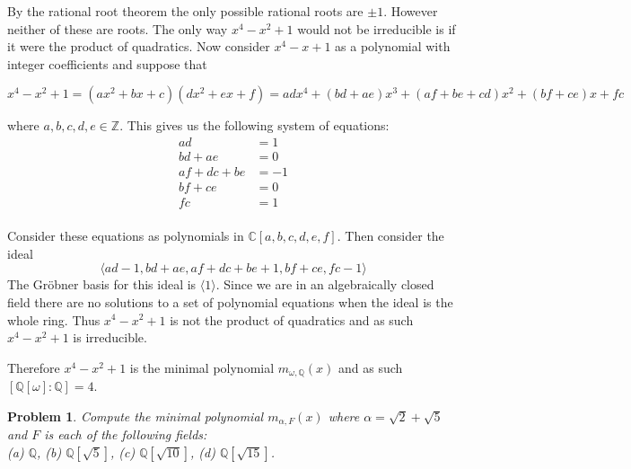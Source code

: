 \documentclass[10pt]{article}
\newcommand{\bb}[1]{\mathbb{#1}}
\theoremstyle{plain}
\newtheorem{problem}{Problem}
\theoremstyle{remark}
\begin{document}
By the rational root theorem the only possible rational roots are $\pm 1$.
However neither of these are roots. The only way $x^4-x^2+1$ would not
be irreducible is if it were the product of quadratics. Now consider
$x^4-x+1$ as a polynomial with integer coefficients and suppose that

\[x^4-x^2+1 = (ax^2+bx+c)(dx^2+ex+f)=adx^4+(bd+ae)x^3+(af+be+cd)x^2+(bf+ce)x+fc\]

where $a,b,c,d,e\in\bb{Z}$. This gives us the following system of equations:
\begin{align*}
  ad &=1\\
  bd+ae &= 0\\
  af+dc+be &= -1\\
  bf+ce &=0 \\
  fc &= 1\\
\end{align*}

Consider these equations as polynomials in $\bb{C}[a,b,c,d,e,f]$. Then
consider the ideal
\[ \langle ad-1,bd+ae,af+dc+be+1,bf+ce,fc-1\rangle \]
The Gr\"obner basis for this ideal is $\langle 1\rangle$. Since we are in an algebraically
closed field there are no solutions to a set of polynomial equations when
the ideal is the whole ring. Thus $x^4-x^2+1$ is not the product of quadratics
and as such $x^4-x^2+1$ is irreducible.

Therefore $x^4-x^2+1$ is the minimal polynomial $m_{\omega,\bb{Q}}(x)$ and as such
$[\bb{Q}[\omega]:\bb{Q}]=4$.

\begin{problem}
  Compute the minimal polynomial $m_{\alpha,F}(x)$ where
  $\alpha = \sqrt{2} + \sqrt{5}$ and $F$ is each of the following fields:\\
  (a) $\mathbb{Q}$, \hspace{1cm} (b)
  $\mathbb{Q}[\sqrt{5}]$, \hspace{1cm} (c) $\mathbb{Q}[\sqrt{10}]$,
  \hspace{1cm} (d) $\mathbb{Q}[\sqrt{15}]$.
\end{problem}
\end{document}
